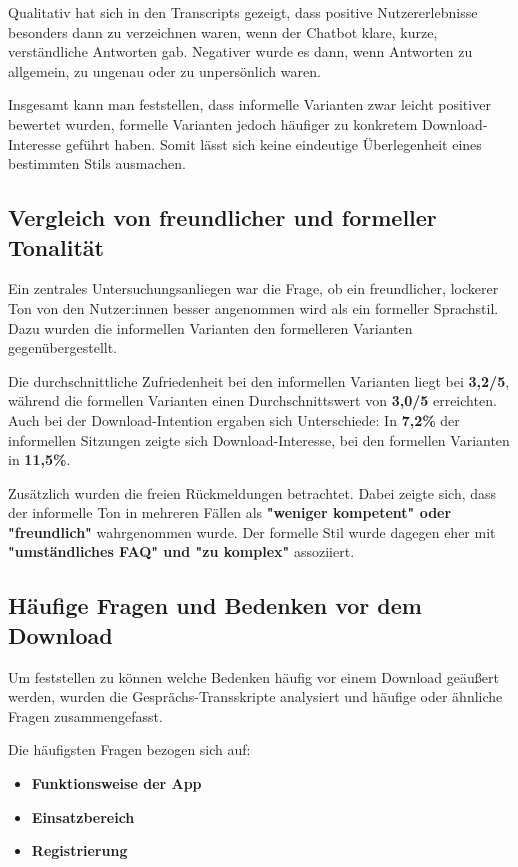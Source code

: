 Qualitativ hat sich in den Transcripts gezeigt, dass positive Nutzererlebnisse 
besonders dann zu verzeichnen waren, wenn der Chatbot klare, kurze, verständliche 
Antworten gab. Negativer wurde es dann, wenn Antworten zu allgemein, zu ungenau 
oder zu unpersönlich waren.

Insgesamt kann man feststellen, dass informelle Varianten zwar leicht positiver
bewertet wurden, formelle Varianten jedoch häufiger zu konkretem Download-Interesse 
geführt haben. Somit lässt sich keine eindeutige Überlegenheit eines bestimmten
Stils ausmachen.

\subsection{Vergleich von freundlicher und formeller Tonalität}

Ein zentrales Untersuchungsanliegen war die Frage, ob ein freundlicher,
lockerer Ton von den Nutzer:innen besser angenommen wird als ein formeller
Sprachstil. Dazu wurden die informellen Varianten den formelleren Varianten
gegenübergestellt.

Die durchschnittliche Zufriedenheit bei den informellen Varianten liegt bei
\textbf{3,2/5}, während die formellen Varianten einen
Durchschnittswert von \textbf{3,0/5} erreichten. Auch bei der
Download-Intention ergaben sich Unterschiede: In
\textbf{7,2\%} der informellen Sitzungen zeigte
sich Download-Interesse, bei den formellen Varianten in
\textbf{11,5\%}.

Zusätzlich wurden die freien Rückmeldungen betrachtet. Dabei zeigte sich,
dass der informelle Ton in mehreren Fällen als \textbf{"weniger kompetent" oder "freundlich"}
wahrgenommen wurde. Der formelle Stil wurde dagegen eher mit
\textbf{"umständliches FAQ" und "zu komplex"}
assoziiert.

\subsection{Häufige Fragen und Bedenken vor dem Download}

Um feststellen zu können welche Bedenken häufig vor einem Download geäußert werden,
wurden die Gesprächs-Transskripte analysiert und häufige oder ähnliche Fragen 
zusammengefasst.

Die häufigsten Fragen bezogen sich auf:
\begin{itemize}
    \item \textbf{Funktionsweise der App}
    \item \textbf{Einsatzbereich}
    \item \textbf{Registrierung}
\end{itemize}

